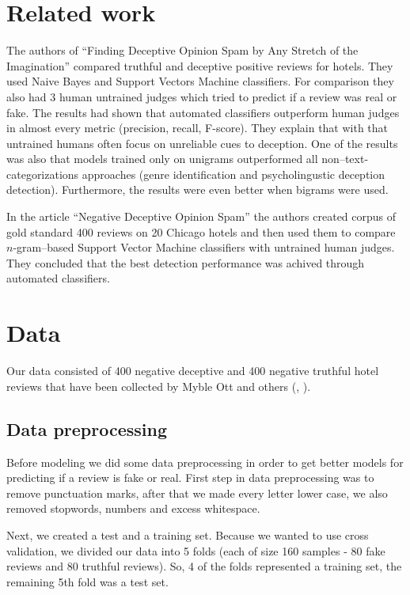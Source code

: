 \documentclass[a4paper,11pt]{article}
\begin{document}
\section{Related work}
\label{sec: relatedwork}
The authors of “Finding Deceptive Opinion Spam by Any Stretch of the Imagination” \cite{article1} compared truthful and deceptive positive reviews for hotels. They used Naive Bayes and Support Vectors Machine classifiers. For comparison they also had 3 human untrained judges which tried to predict if a review was real or fake.  The results had shown that automated classifiers outperform human judges in almost every metric (precision, recall, F-score). They explain that with that untrained humans often focus on unreliable cues to
deception. One of the results was also that models trained only on unigrams outperformed all non--text-categorizations approaches (genre identification and psycholingustic deception detection). Furthermore, the results were even better when bigrams were used.

In the article “Negative Deceptive Opinion Spam” \cite{article2} the authors created corpus of gold standard 400 reviews on 20 Chicago hotels and then used them to compare $n$-gram--based Support Vector Machine classifiers with untrained human judges. They concluded that the best detection performance was achived through automated classifiers. 




\section{Data}
\label{sec: data}
Our data consisted of 400 negative deceptive and 400 negative truthful hotel reviews that have been collected by Myble Ott and others (\cite{article2}, \cite{article1}). 

\subsection{Data preprocessing}
Before modeling we did some data preprocessing in order to get better models for predicting if a review is fake or real. First step in data preprocessing was to remove punctuation marks, after that we made every letter lower case, we also removed stopwords, numbers and excess whitespace. 

Next, we created a test and a training set. Because we wanted to use cross validation, we divided our data into 5 folds (each of size 160 samples - 80 fake reviews and 80 truthful reviews). So, 4 of the folds represented a training set, the remaining 5th fold was a test set. 
\end{document}
